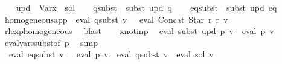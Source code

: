 \begin{isabellebody}
\ \ \isamarkupfalse%
\ {\isacharquery}{\kern0pt}upd\ {\isacharequal}{\kern0pt}\ {\isachardoublequoteopen}Var{\isacharparenleft}{\kern0pt}x\ {\isacharcolon}{\kern0pt}{\isacharequal}{\kern0pt}\ sol{\isacharparenright}{\kern0pt}{\isachardoublequoteclose}\isanewline
\ \ \isamarkupfalse%
\ {\isacharquery}{\kern0pt}q{\isacharunderscore}{\kern0pt}subst\ {\isacharequal}{\kern0pt}\ {\isachardoublequoteopen}subst\ {\isacharquery}{\kern0pt}upd\ q{\isachardoublequoteclose}\isanewline
\ \ \isamarkupfalse%
\ {\isacharquery}{\kern0pt}eq{\isacharunderscore}{\kern0pt}subst\ {\isacharequal}{\kern0pt}\ {\isachardoublequoteopen}subst\ {\isacharquery}{\kern0pt}upd\ eq{\isachardoublequoteclose}\isanewline
\ \ \isamarkupfalse%
\ homogeneous{\isacharunderscore}{\kern0pt}app{\isacharcolon}{\kern0pt}\ {\isachardoublequoteopen}{\isasymPsi}\ {\isacharparenleft}{\kern0pt}eval\ {\isacharquery}{\kern0pt}q{\isacharunderscore}{\kern0pt}subst\ v{\isacharparenright}{\kern0pt}\ {\isasymsubseteq}\ {\isasymPsi}\ {\isacharparenleft}{\kern0pt}eval\ {\isacharparenleft}{\kern0pt}Concat\ {\isacharparenleft}{\kern0pt}Star\ {\isacharquery}{\kern0pt}r{\isacharparenright}{\kern0pt}\ {\isacharquery}{\kern0pt}r{\isacharparenright}{\kern0pt}\ v{\isacharparenright}{\kern0pt}{\isachardoublequoteclose}\isanewline
\ \ \ \ \isamarkupfalse%
\ rlexp{\isacharunderscore}{\kern0pt}homogeneous\ \isamarkupfalse%
\ blast\isanewline
\ \ \isamarkupfalse%
\ x{\isacharunderscore}{\kern0pt}not{\isacharunderscore}{\kern0pt}in{\isacharunderscore}{\kern0pt}p\ \isamarkupfalse%
\ {\isachardoublequoteopen}eval\ {\isacharparenleft}{\kern0pt}subst\ {\isacharquery}{\kern0pt}upd\ p{\isacharparenright}{\kern0pt}\ v\ {\isacharequal}{\kern0pt}\ eval\ p\ v{\isachardoublequoteclose}\ \isamarkupfalse%
\ eval{\isacharunderscore}{\kern0pt}vars{\isacharunderscore}{\kern0pt}subst{\isacharbrackleft}{\kern0pt}of\ p{\isacharbrackright}{\kern0pt}\ \isamarkupfalse%
\ simp\isanewline
\ \ \isamarkupfalse%
\ \isamarkupfalse%
\ {\isachardoublequoteopen}{\isasymPsi}\ {\isacharparenleft}{\kern0pt}eval\ {\isacharquery}{\kern0pt}eq{\isacharunderscore}{\kern0pt}subst\ v{\isacharparenright}{\kern0pt}\ {\isacharequal}{\kern0pt}\ {\isasymPsi}\ {\isacharparenleft}{\kern0pt}eval\ p\ v\ {\isasymunion}\ eval\ {\isacharquery}{\kern0pt}q{\isacharunderscore}{\kern0pt}subst\ v\ {\isacharat}{\kern0pt}{\isacharat}{\kern0pt}\ eval\ sol\ v{\isacharparenright}{\kern0pt}{\isachardoublequoteclose}\isanewline

\end{isabellebody}
